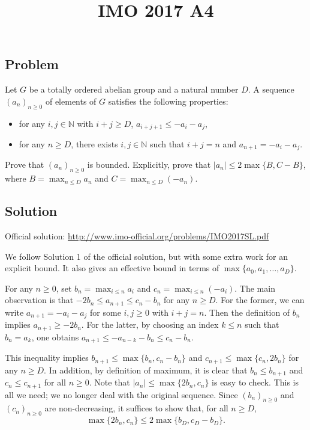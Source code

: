 \documentclass{article}
\title{IMO 2017 A4}
\author{}
\date{}
\newcommand{\N}{\mathbb{N}}
\begin{document}
\maketitle

\subsection*{Problem}

Let $G$ be a totally ordered abelian group and a natural number $D$.
A sequence $(a_n)_{n \geq 0}$ of elements of $G$ satisfies the following properties:
\begin{itemize}
    \item   for any $i, j \in \N$ with $i + j \geq D$, $a_{i + j + 1} \leq -a_i - a_j$,
    \item   for any $n \geq D$, there exists $i, j \in \N$ such that $i + j = n$ and $a_{n + 1} = -a_i - a_j$.
\end{itemize}
Prove that $(a_n)_{n \geq 0}$ is bounded.
Explicitly, prove that $|a_n| \leq 2 \max\{B, C - B\}$, where $B = \max_{n \leq D} a_n$ and $C = \max_{n \leq D} (-a_n)$.



\subsection*{Solution}

Official solution: \url{http://www.imo-official.org/problems/IMO2017SL.pdf}

We follow Solution 1 of the official solution, but with some extra work for an explicit bound.
It also gives an effective bound in terms of $\max\{a_0, a_1, \ldots, a_D\}$.

For any $n \geq 0$, set $b_n = \max_{i \leq n} a_i$ and $c_n = \max_{i \leq n} (-a_i)$.
The main observation is that $-2 b_n \leq a_{n + 1} \leq c_n - b_n$ for any $n \geq D$.
For the former, we can write $a_{n + 1} = -a_i - a_j$ for some $i, j \geq 0$ with $i + j = n$.
Then the definition of $b_n$ implies $a_{n + 1} \geq -2 b_n$.
For the latter, by choosing an index $k \leq n$ such that $b_n = a_k$, one obtains $a_{n + 1} \leq -a_{n - k} - b_n \leq c_n - b_n$.

This inequality implies $b_{n + 1} \leq \max\{b_n, c_n - b_n\}$ and $c_{n + 1} \leq \max\{c_n, 2 b_n\}$ for any $n \geq D$.
In addition, by definition of maximum, it is clear that $b_n \leq b_{n + 1}$ and $c_n \leq c_{n + 1}$ for all $n \geq 0$.
Note that $|a_n| \leq \max\{2 b_n, c_n\}$ is easy to check.
This is all we need; we no longer deal with the original sequence.
Since $(b_n)_{n \geq 0}$ and $(c_n)_{n \geq 0}$ are non-decreasing, it suffices to show that, for all $n \geq D$,
\[ \max\{2 b_n, c_n\} \leq 2 \max\{b_D, c_D - b_D\}. \tag{1}\label{2017a4-eq1} \]
\end{document}
